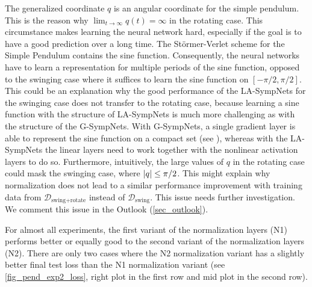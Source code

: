 \documentclass[twoside,a4paper]{article}
\begin{document}
The generalized coordinate $q$ is an angular coordinate for the simple pendulum. 
This is the reason why $\lim_{t \to \infty} q(t) = \infty$
in the rotating case. This circumstance makes learning the neural network hard, especially if the
goal is to have a good prediction over a long time.
The Störmer-Verlet scheme for the Simple Pendulum contains the sine function.
Consequently, the neural networks have to learn a representation for multiple periods of 
the sine function, opposed to the swinging case where it suffices to learn the sine function 
on $[-\pi/2, \pi/2]$. This could be an explanation why the good performance 
of the LA-SympNets for the swinging case does not transfer to the rotating case, because
learning a sine function with the structure of LA-SympNets is much more challenging as with the
structure of the G-SympNets. With G-SympNets, a single gradient layer is able to represent
the sine function on a compact set (see \citet[Lemma 4]{Jin2020}), whereas with the LA-SympNets 
the linear layers need to work together with the nonlinear activation layers to do so.
Furthermore, intuitively, the large values of $q$ in the rotating case could mask the swinging case, 
where $\left|{q}\right| \leq \pi/2$. This might explain why normalization does not 
lead to a similar performance improvement with 
training data from $\mathcal{D}_{\text{swing+rotate}}$ instead of $\mathcal{D}_{\text{swing}}$. 
This issue needs further investigation. We comment this issue in the Outlook (\cref{sec_outlook}).

For almost all experiments, the first variant of the normalization layers (N1) performs better or equally good
to the second variant of the normalization layers (N2). There are only two cases where the N2 normalization variant
has a slightly better final test loss than the N1 normalization variant 
(see \cref{fig_pend_exp2_loss}, right plot in the first row and mid plot in the second row).
\end{document}
